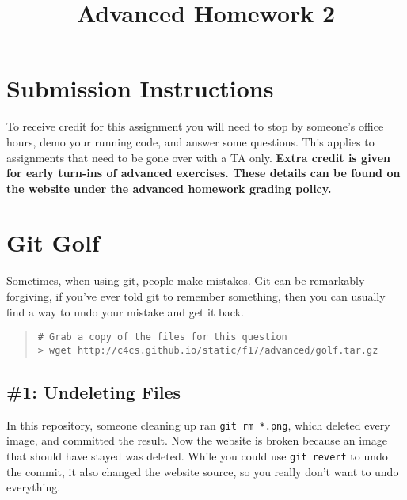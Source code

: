 \documentclass{article}
\begin{document}
\fancyfoot[C]{\color{gray} \thepage~/~\pageref*{LastPage}}
\pagestyle{fancyplain}

\title{\textbf{Advanced Homework 2\\}}
\author{\textbf{\color{red}{Due: Wednesday, September 27th, 11:59PM (Hard Deadline)}}}
\date{}
\maketitle


\section*{Submission Instructions}
To receive credit for this assignment you will need to stop by someone's
office hours, demo your running code, and answer some questions. \textbf{\color{red}{Make sure
to check the office hour schedule as the real due date is at the last office
hours before the date listed above.}} This applies to assignments that need to be gone over with a TA only.
\textbf{Extra credit is given for early turn-ins of advanced exercises. These details can be found on the website under the advanced homework grading policy.}


\section{Git Golf}

Sometimes, when using git, people make mistakes. Git can be remarkably
forgiving, if you've ever told git to remember something, then you can usually
find a way to undo your mistake and get it back.

\begin{quote}
\begin{lstlisting}
# Grab a copy of the files for this question
> wget http://c4cs.github.io/static/f17/advanced/golf.tar.gz
\end{lstlisting}
\end{quote}

\subsection*{\#1: Undeleting Files}

In this repository, someone cleaning up ran
\texttt{git~rm~*.png}, which deleted every image, and committed the result.
Now the website is broken because an image that should have stayed was
deleted. While you could use \texttt{git~revert} to undo the commit, it also
changed the website source, so you really don't want to undo everything.
\end{document}
